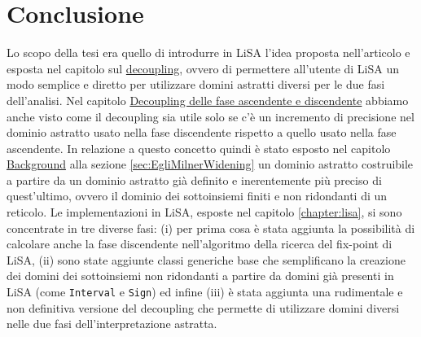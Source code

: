 \chapter*{Conclusione} %
Lo scopo della tesi era quello di introdurre in LiSA l'idea proposta nell'articolo \cite{DBLP:conf/aplas/ArceriMZ22} e esposta nel capitolo sul \hyperref[chapter:decoupling]{decoupling}, ovvero di permettere all'utente di LiSA un modo semplice e diretto per utilizzare domini astratti diversi per le due fasi dell'analisi. Nel capitolo \hyperref[chapter:decoupling]{Decoupling delle fase ascendente e discendente} abbiamo anche visto come il decoupling sia utile solo se c'è un incremento di precisione nel dominio  astratto usato nella fase discendente rispetto a quello usato nella fase ascendente. In relazione a questo concetto quindi è stato esposto nel capitolo \hyperref[chapter:background]{Background} alla sezione \ref{sec:EgliMilnerWidening} un dominio astratto costruibile a partire da un dominio astratto già definito e inerentemente più preciso di quest'ultimo, ovvero il dominio dei sottoinsiemi finiti e non ridondanti di un reticolo. Le implementazioni in LiSA, esposte nel capitolo \ref{chapter:lisa}, si sono concentrate in tre diverse fasi: (i) per prima cosa è stata aggiunta la possibilità di calcolare anche la fase discendente nell'algoritmo della ricerca del fix-point di LiSA, (ii) sono state aggiunte classi generiche base che semplificano la creazione dei domini dei sottoinsiemi non ridondanti a partire da domini già presenti in LiSA (come \texttt{Interval} e \texttt{Sign}) ed infine (iii) è stata aggiunta una rudimentale e non definitiva versione del decoupling che permette di utilizzare domini diversi nelle due fasi dell'interpretazione astratta.

